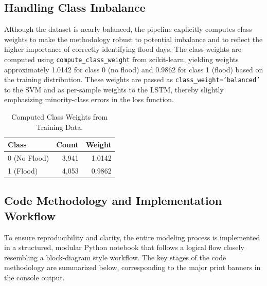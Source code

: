 \documentclass[conference]{IEEEtran}
\begin{document}
\subsection{Handling Class Imbalance}
Although the dataset is nearly balanced, the pipeline explicitly computes class weights to make the methodology robust to potential imbalance and to reflect the higher importance of correctly identifying flood days. The class weights are computed using \texttt{compute\_class\_weight} from scikit-learn, yielding weights approximately 1.0142 for class 0 (no flood) and 0.9862 for class 1 (flood) based on the training distribution. These weights are passed as \texttt{class\_weight='balanced'} to the SVM and as per-sample weights to the LSTM, thereby slightly emphasizing minority-class errors in the loss function. 

\begin{table}[htbp]
\caption{Computed Class Weights from Training Data.}
\centering
\begin{tabular}{lrr}
\toprule
\textbf{Class} & \textbf{Count} & \textbf{Weight} \\
\midrule
0 (No Flood) & 3{,}941 & 1.0142 \\
1 (Flood)    & 4{,}053 & 0.9862 \\
\bottomrule
\end{tabular}
\label{tab:weights}
\end{table}

\subsection{Code Methodology and Implementation Workflow}
To ensure reproducibility and clarity, the entire modeling process is implemented in a structured, modular Python notebook that follows a logical flow closely resembling a block-diagram style workflow. The key stages of the code methodology are summarized below, corresponding to the major print banners in the console output. 
\end{document}
